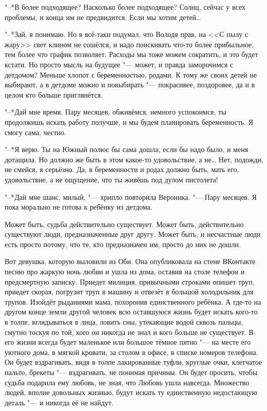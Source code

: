 "--*В более подходящее?
Насколько более подходящее?
Солнц, сейчас у всех проблемы, и конца им не предвидится.
Если мы хотим детей\ldots{}

"--*Зай, я понимаю.
Но я всё-таки подумал, что Володя прав, на <<С пылу с жару>> свет клином не сошёлся, и надо поискивать что-то более прибыльное, тем более что график позволяет.
Расходы мы тоже можем сократить, и это будет кстати.
Но просто мысль на будущее "--- может, и правда заморочимся с детдомом?
Меньше хлопот с беременностью, родами.
К тому же своих детей не выбирают, а в детдоме можно и повыбирать "--- покрасивее, поздоровее, да и в целом кто больше приглянётся.

"--*Дай мне время.
Пару месяцев, обживёмся, немного успокоимся, ты продолжишь искать работу получше, и мы будем планировать беременность.
Я смогу сама, честно.

"--*Я верю.
Ты на Южный полюс бы сама дошла, если бы надо было, и меня дотащила.
Но должно же быть в этом какое-то удовольствие, а не\ldots{}
Нет, подожди, не смейся, я серьёзно.
Да, в беременности и родах должно быть, мать его, удовольствие, а не ощущение, что ты живёшь под дулом пистолета!

"--*Дай мне шанс, милый, "--- хрипло повторила Вероника.
"--- Пару месяцев.
Я пока морально не готова к ребёнку из детдома.

\asterism

Может быть, судьба действительно существует.
Может быть, действительно существуют люди, предназначенные друг другу.
Может быть, и несчастные люди есть просто потому, что те, кто предназначен им, просто до них не дошли.

Вот девушка, которую выловили из Оби.
Она опубликовала на стене ВКонтакте песню про жаркую ночь любви и ушла из дома, оставив на столе телефон и предсмертную записку.
Приедет милиция, привычными строками опишет труп, приедет скорая, погрузит труп в машину и отвезёт в большой холодильник для трупов.
Изойдёт рыданиями мама, похоронив единственного ребёнка.
А где-то на другом конце земли другой человек всю оставшуюся жизнь будет искать кого-то в толпе, вглядываться в лица, ловить сны, утекающие водой сквозь пальцы, смутно тоскуя по той, кого он никогда не знал и кого больше не существует.
В его жизни всегда будет маленькое или большое тёмное пятно "--- на месте его уютного дома, в мягкой кровати, за столом в офисе, в списке номеров телефона.
Он будет вздрагивать, видя в толпе лакированные туфли, круглые очки, клетчатое пальто, брекеты "--- вздрагивать, не понимая причины.
Он будет просить, чтобы судьба подарила ему любовь, не зная, что Любовь ушла навсегда.
Множество людей, вполне довольных жизнью, будут искать ту единственную недостающую деталь "--- и никогда её не найдут.

